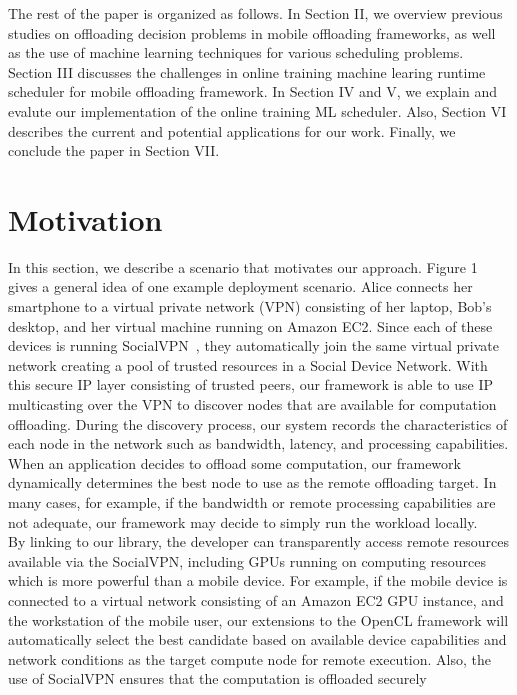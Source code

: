 \documentclass[10pt, conference, compsocconf]{IEEEtran}
\begin{document}
%
\indent The rest of the paper is organized  as follows.
%
In Section II, we overview previous studies on offloading decision
problems in mobile offloading frameworks, as well as the use of machine
learning techniques for various scheduling problems.
%
Section III discusses the challenges in online training machine learing
runtime scheduler for mobile offloading framework.
%
In Section IV and V, we explain and evalute our implementation of the
online training ML scheduler.
%
Also, Section VI describes the current and potential applications for
our work.
%
Finally, we conclude the paper in Section VII.
%
\section{Motivation}
%
In this section, we describe a scenario that motivates our approach.
%
Figure 1 gives a general idea of one example deployment scenario.
%
Alice connects her smartphone to a virtual private network (VPN) consisting 
of her laptop, Bob's desktop, and her virtual machine running on Amazon EC2.
%
Since each of these devices is running SocialVPN~\cite{socialvpn}, they 
automatically join the same virtual private network creating a pool of trusted 
resources in a Social Device Network.
%
With this secure IP layer consisting of trusted peers, our framework is 
able to use IP multicasting over the VPN to discover nodes that are available 
for computation offloading.
%
During the discovery process, our system records the characteristics of each 
node in the network such as bandwidth, latency, and processing capabilities.
%
When an application decides to offload some computation, our framework 
dynamically determines the best node to use as the remote offloading target.
%
In many cases, for example, if the bandwidth or remote processing capabilities 
are not adequate, our framework may decide to simply run the workload
locally.\\
%
\indent By linking to our library, the developer can transparently access remote 
resources available via the SocialVPN, including GPUs running on computing
resources which is more powerful than a mobile 
device.
%
For example, if the mobile device is connected to a virtual network 
consisting of an Amazon EC2 GPU instance, and the workstation of the
mobile user, our extensions to the OpenCL framework will automatically 
select the best candidate based on available device capabilities and 
network conditions as the target compute node for remote execution.
%
Also, the use of SocialVPN ensures that the computation is offloaded securely
\end{document}
